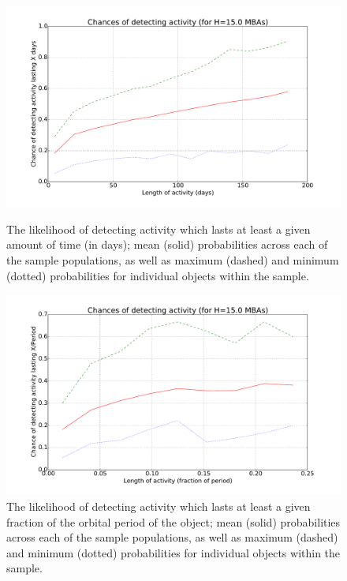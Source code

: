 \documentclass{iau}
\begin{document}
\begin{figure}[tb]
\begin{minipage}{.5\textwidth}
\begin{center}
\includegraphics[width=0.9\linewidth]{activityTime}
\captionsetup{width=0.9\linewidth}
\caption{The likelihood of detecting activity which lasts at least a
  given amount of time (in days); mean (solid)
  probabilities across each of the sample populations, as well as maximum
  (dashed) and minimum (dotted) probabilities for individual objects
  within the sample.
\label{activityTime}}
\end{center}
\end{minipage}
\begin{minipage}{.5\textwidth}
\begin{center}
\includegraphics[width=0.9\linewidth]{activityPeriod}
\captionsetup{width=0.9\linewidth}
\caption{The likelihood of detecting activity which lasts at least a
  given fraction of the orbital period of the object; mean (solid)
  probabilities across each of the sample populations, as well as maximum
  (dashed) and minimum (dotted) probabilities for individual objects
  within the sample.
\label{activityPeriod}}
\end{center}
\end{minipage}
\end{figure}
\end{document}
